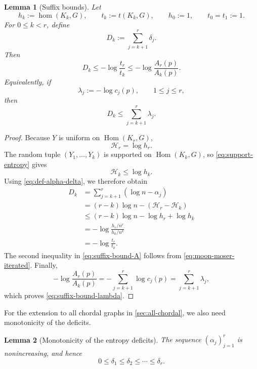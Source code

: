 \documentclass[11pt]{article}
\newtheorem{lemma}[lemma]{Lemma}
\numberwithin{equation}{section}
\DeclareMathOperator{\Hom}{Hom}
\DeclareMathOperator{\homnum}{hom}
\newcommand{\cH}{\mathcal H}
\newcommand{\K}{K}
\begin{document}
\begin{lemma}[Suffix bounds]\label{lem:suffix-bounds}
Let
\[
 h_k:=\homnum(\K_k,G),
 \qquad
 t_k:=t(\K_k,G),
 \qquad
 h_0:=1,
 \qquad
 t_0=t_1:=1.
\]
For $0\leq k<r$, define
\[
 D_k:=\sum_{j=k+1}^r\delta_j.
\]
Then
\begin{equation}
 D_k
 \leq
 -\log\frac{t_r}{t_k}
 \leq
 -\log\frac{A_r(p)}{A_k(p)}.\label{eq:suffix-bound-A}
\end{equation}
Equivalently, if
\begin{equation}
 \lambda_j:=-\log c_j(p),
 \qquad 1\leq j\leq r,\label{eq:def-lambda}
\end{equation}
then
\begin{equation}
 D_k\leq\sum_{j=k+1}^r\lambda_j.\label{eq:suffix-bound-lambda}
\end{equation}
\end{lemma}

\begin{proof}
Because $Y$ is uniform on $\Hom(K_r,G)$,
\[
 \cH_r=\log h_r.
\]
The random tuple $(Y_1,\dots,Y_k)$ is supported on
$\Hom(K_k,G)$, so \eqref{eq:support-entropy} gives
\[
 \cH_k\leq\log h_k.
\]
Using \eqref{eq:def-alpha-delta}, we therefore obtain
\[
 \begin{aligned}
 D_k
 &=\sum_{j=k+1}^r(\log n-\alpha_j)\\
 &=(r-k)\log n-(\cH_r-\cH_k)\\
 &\leq(r-k)\log n-\log h_r+\log h_k\\
 &=-\log\frac{h_r/n^r}{h_k/n^k}\\
 &=-\log\frac{t_r}{t_k}.
 \end{aligned}
\]
The second inequality in \eqref{eq:suffix-bound-A} follows from
\eqref{eq:moon-moser-iterated}.  Finally,
\[
 -\log\frac{A_r(p)}{A_k(p)}
 =-\sum_{j=k+1}^r\log c_j(p)
 =\sum_{j=k+1}^r\lambda_j,
\]
which proves \eqref{eq:suffix-bound-lambda}.
\end{proof}

For the extension to all chordal graphs in \cref{sec:all-chordal}, we
also need monotonicity of the deficits.

\begin{lemma}[Monotonicity of the entropy deficits]
\label{lem:delta-monotone}
The sequence $(\alpha_j)_{j=1}^r$ is nonincreasing, and hence
\begin{equation}
 0\leq\delta_1\leq\delta_2\leq\cdots\leq\delta_r.\label{eq:delta-monotone}
\end{equation}
\end{lemma}
\end{document}
